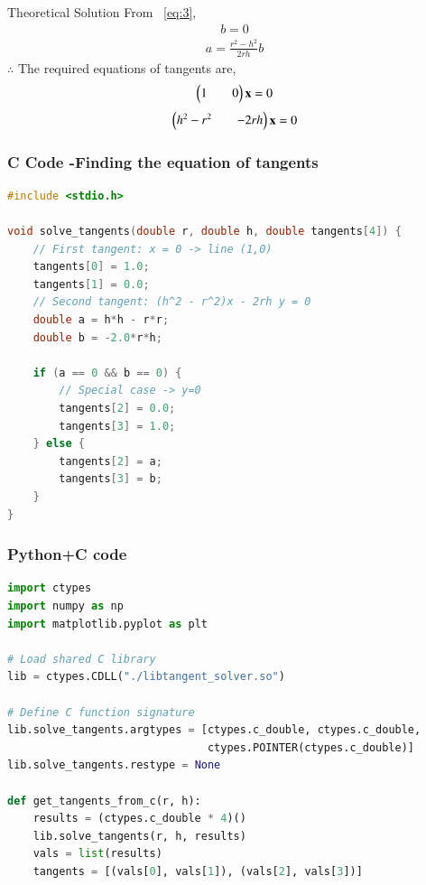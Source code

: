 \documentclass{beamer}
\begin{document}
\begin{frame}{Theoretical Solution}
From ~\eqref{eq:3},
\begin{align}
    b=0
\end{align}
\begin{align}
    a=\frac{r^2-h^2}{2rh}b
\end{align}
$\therefore$ The required equations of tangents are,
\begin{align}
    \begin{pmatrix}1&&0\end{pmatrix}\mathbf{x}=0
\end{align}
\begin{align}
    \begin{pmatrix}h^2-r^2&&-2rh\end{pmatrix}\mathbf{x}=0
\end{align}
\end{frame}

\begin{frame}[fragile]
    \frametitle{C Code -Finding the equation of tangents}

    \begin{lstlisting}[language=C]
#include <stdio.h>

void solve_tangents(double r, double h, double tangents[4]) {
    // First tangent: x = 0 -> line (1,0)
    tangents[0] = 1.0;
    tangents[1] = 0.0;
    // Second tangent: (h^2 - r^2)x - 2rh y = 0
    double a = h*h - r*r;
    double b = -2.0*r*h;

    if (a == 0 && b == 0) {
        // Special case -> y=0
        tangents[2] = 0.0;
        tangents[3] = 1.0;
    } else {
        tangents[2] = a;
        tangents[3] = b;
    }
}
    \end{lstlisting}
\end{frame}


\begin{frame}[fragile]
    \frametitle{Python+C code}

    \begin{lstlisting}[language=Python]
import ctypes
import numpy as np
import matplotlib.pyplot as plt

# Load shared C library
lib = ctypes.CDLL("./libtangent_solver.so")

# Define C function signature
lib.solve_tangents.argtypes = [ctypes.c_double, ctypes.c_double,
                               ctypes.POINTER(ctypes.c_double)]
lib.solve_tangents.restype = None

def get_tangents_from_c(r, h):
    results = (ctypes.c_double * 4)()
    lib.solve_tangents(r, h, results)
    vals = list(results)
    tangents = [(vals[0], vals[1]), (vals[2], vals[3])]
    \end{lstlisting}
\end{frame}
\end{document}
